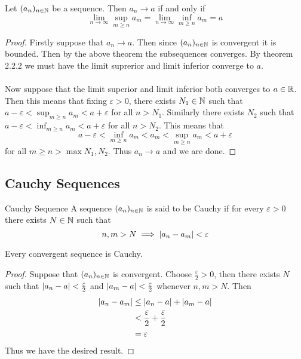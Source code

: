 \documentclass[a4paper]{article}
\begin{document}
\begin{prp}{}{} Let $(a_n)_{n\in\mathbb{N}}$ be a sequence. Then $a_n\to a$ if and only if $$\lim_{n\to\infty}\sup_{m\geq n}a_m=\lim_{n\to\infty}\inf_{m\geq n}a_m=a$$ \tcbline
\begin{proof}
Firstly suppose that $a_n\to a$. Then since $(a_n)_{n\in\mathbb{N}}$ is convergent it is bounded. Then by the above theorem the subsequences converges. By theorem 2.2.2 we must have the limit suprerior and limit inferior converge to $a$. \\~\\
Now suppose that the limit superior and limit inferior both converges to $a\in\mathbb{R}$. Then this means that fixing $\varepsilon>0$, there exists $N_1\in\mathbb{N}$ such that $a-\varepsilon<\sup_{m\geq n}a_m<a+\varepsilon$ for all $n>N_1$. Similarly there exists $N_2$ such that $a-\varepsilon<\inf_{m\geq n}a_m<a+\varepsilon$ for all $n>N_2$. This means that $$a-\varepsilon<\inf_{m\geq n}a_m<a_m<\sup_{m\geq n}a_m<a+\varepsilon$$ for all $m\geq n>\max{N_1,N_2}$. Thus $a_n\to a$ and we are done. 
\end{proof}
\end{prp}

\subsection{Cauchy Sequences}
\begin{defn}{Cauchy Sequence}{} A sequence $(a_n)_{n\in\mathbb{N}}$ is said to be Cauchy if for every $\varepsilon>0$ there exists $N\in\mathbb{N}$ such that $$n,m>N\implies\abs{a_n-a_m}<\varepsilon$$
\end{defn}

\begin{prp}{}{} Every convergent sequence is Cauchy. \tcbline
\begin{proof} Suppose that $(a_n)_{n\in\mathbb{N}}$ is convergent. Choose $\frac{\varepsilon}{2}>0$, then there exists $N$ such that $\abs{a_n-a}<\frac{\varepsilon}{2}$ and $\abs{a_m-a}<\frac{\varepsilon}{2}$ whenever $n,m>N$. Then 
\begin{align*}
\abs{a_n-a_m}&\leq\abs{a_n-a}+\abs{a_m-a} \\
&<\frac{\varepsilon}{2}+\frac{\varepsilon}{2} \\
&=\varepsilon
\end{align*}
Thus we have the desired result. 
\end{proof}
\end{prp}
\end{document}
